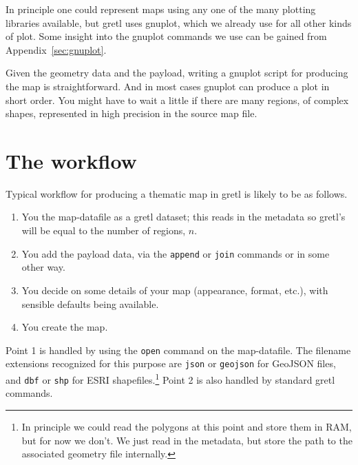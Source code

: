 \documentclass{article}
\begin{document}
In principle one could represent maps using any one of the many
plotting libraries available, but gretl uses \textsf{gnuplot}, which
we already use for all other kinds of plot. Some insight into the
\textsf{gnuplot} commands we use can be gained from
Appendix~\ref{sec:gnuplot}.

Given the geometry data and the payload, writing a \textsf{gnuplot}
script for producing the map is straightforward. And in most cases
\textsf{gnuplot} can produce a plot in short order. You might have to
wait a little if there are many regions, of complex shapes,
represented in high precision in the source map file.

\section{The workflow}
\label{sec:workflow}

Typical workflow for producing a thematic map in gretl is likely to be
as follows.

\begin{enumerate}
\item You  the map-datafile as a gretl dataset; this reads
  in the metadata so gretl's  will be equal to the number
  of regions, $n$.
\item You add the payload data, via the \texttt{append} or
  \texttt{join} commands or in some other way.
\item You decide on some details of your map (appearance, format,
  etc.), with sensible defaults being available.
\item You create the map.
\end{enumerate}

Point 1 is handled by using the \texttt{open} command on the
map-datafile. The filename extensions recognized for this purpose are
\texttt{json} or \texttt{geojson} for GeoJSON files, and \texttt{dbf}
or \texttt{shp} for ESRI shapefiles.\footnote{In principle we could
  read the polygons at this point and store them in RAM, but for now
  we don't. We just read in the metadata, but store the path to the
  associated geometry file internally.} Point 2 is also handled by
standard gretl commands.
\end{document}

